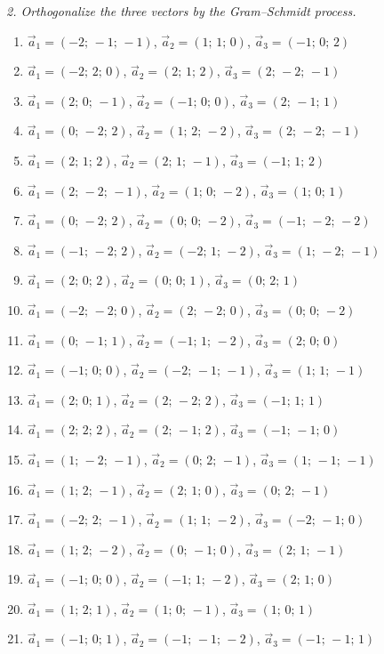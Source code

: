 \emph{2. Orthogonalize the three vectors by the Gram–Schmidt process.}
\bigskip
\begin{enumerate}[label=\arabic*., leftmargin=*]
\item $\vec a_1=(-2;\,-1;\,-1)$, $\vec a_2=(1;\,1;\,0)$, $\vec a_3=(-1;\,0;\,2)$
\item $\vec a_1=(-2;\,2;\,0)$, $\vec a_2=(2;\,1;\,2)$, $\vec a_3=(2;\,-2;\,-1)$
\item $\vec a_1=(2;\,0;\,-1)$, $\vec a_2=(-1;\,0;\,0)$, $\vec a_3=(2;\,-1;\,1)$
\item $\vec a_1=(0;\,-2;\,2)$, $\vec a_2=(1;\,2;\,-2)$, $\vec a_3=(2;\,-2;\,-1)$
\item $\vec a_1=(2;\,1;\,2)$, $\vec a_2=(2;\,1;\,-1)$, $\vec a_3=(-1;\,1;\,2)$
\item $\vec a_1=(2;\,-2;\,-1)$, $\vec a_2=(1;\,0;\,-2)$, $\vec a_3=(1;\,0;\,1)$
\item $\vec a_1=(0;\,-2;\,2)$, $\vec a_2=(0;\,0;\,-2)$, $\vec a_3=(-1;\,-2;\,-2)$
\item $\vec a_1=(-1;\,-2;\,2)$, $\vec a_2=(-2;\,1;\,-2)$, $\vec a_3=(1;\,-2;\,-1)$
\item $\vec a_1=(2;\,0;\,2)$, $\vec a_2=(0;\,0;\,1)$, $\vec a_3=(0;\,2;\,1)$
\item $\vec a_1=(-2;\,-2;\,0)$, $\vec a_2=(2;\,-2;\,0)$, $\vec a_3=(0;\,0;\,-2)$
\item $\vec a_1=(0;\,-1;\,1)$, $\vec a_2=(-1;\,1;\,-2)$, $\vec a_3=(2;\,0;\,0)$
\item $\vec a_1=(-1;\,0;\,0)$, $\vec a_2=(-2;\,-1;\,-1)$, $\vec a_3=(1;\,1;\,-1)$
\item $\vec a_1=(2;\,0;\,1)$, $\vec a_2=(2;\,-2;\,2)$, $\vec a_3=(-1;\,1;\,1)$
\item $\vec a_1=(2;\,2;\,2)$, $\vec a_2=(2;\,-1;\,2)$, $\vec a_3=(-1;\,-1;\,0)$
\item $\vec a_1=(1;\,-2;\,-1)$, $\vec a_2=(0;\,2;\,-1)$, $\vec a_3=(1;\,-1;\,-1)$
\item $\vec a_1=(1;\,2;\,-1)$, $\vec a_2=(2;\,1;\,0)$, $\vec a_3=(0;\,2;\,-1)$
\item $\vec a_1=(-2;\,2;\,-1)$, $\vec a_2=(1;\,1;\,-2)$, $\vec a_3=(-2;\,-1;\,0)$
\item $\vec a_1=(1;\,2;\,-2)$, $\vec a_2=(0;\,-1;\,0)$, $\vec a_3=(2;\,1;\,-1)$
\item $\vec a_1=(-1;\,0;\,0)$, $\vec a_2=(-1;\,1;\,-2)$, $\vec a_3=(2;\,1;\,0)$
\item $\vec a_1=(1;\,2;\,1)$, $\vec a_2=(1;\,0;\,-1)$, $\vec a_3=(1;\,0;\,1)$
\item $\vec a_1=(-1;\,0;\,1)$, $\vec a_2=(-1;\,-1;\,-2)$, $\vec a_3=(-1;\,-1;\,1)$

\end{enumerate}
